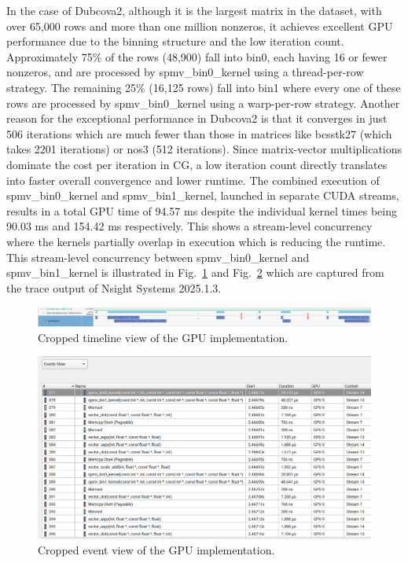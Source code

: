 \documentclass[conference]{IEEEtran}
\begin{document}
In the case of Dubcova2, although it is the largest matrix in the dataset, with over 65,000 rows and more than one million nonzeros, it achieves excellent GPU performance due to the binning structure and the low iteration count. Approximately 75\% of the rows (48,900) fall into bin0, each having 16 or fewer nonzeros, and are processed by spmv\_bin0\_kernel using a thread-per-row strategy. The remaining 25\% (16,125 rows) fall into bin1 where every one of these rows are processed by spmv\_bin0\_kernel using a warp-per-row strategy. Another reason for the exceptional performance in Dubcova2 is that it converges in just 506 iterations which are much fewer than those in matrices like bcsstk27 (which takes 2201 iterations) or nos3 (512 iterations). Since matrix-vector multiplications dominate the cost per iteration in CG, a low iteration count directly translates into faster overall convergence and lower runtime. The combined execution of spmv\_bin0\_kernel and spmv\_bin1\_kernel, launched in separate CUDA streams, results in a total GPU time of 94.57 ms despite the individual kernel times being 90.03 ms and 154.42 ms respectively. This shows a stream-level concurrency where the kernels partially overlap in execution which is reducing the runtime. This stream-level concurrency between spmv\_bin0\_kernel and spmv\_bin1\_kernel is illustrated in Fig.~\ref{timelineFig} and Fig.~\ref{eventsFig} which are captured from the trace output of Nsight Systems 2025.1.3.
 
\begin{figure}[htbp]
\centering
\includegraphics[width=\columnwidth]{timeline.png}
\caption{Cropped timeline view of the GPU implementation.}
\label{timelineFig}
\end{figure}

\begin{figure}[htbp]
\centering
\includegraphics[width=\columnwidth]{events.png}
\caption{Cropped event view of the GPU implementation.}
\label{eventsFig}
\end{figure}
\end{document}
